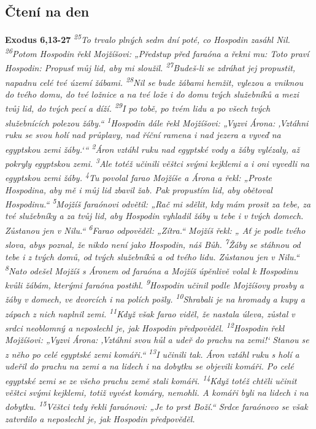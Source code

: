 \documentclass[11pt]{article}
\begin{document}
\subsection*{Čtení na den}
\textbf{Exodus 6,13-27}
\newline
\textit{ 
\textsuperscript{25}To trvalo plných sedm dní poté, co Hospodin zasáhl Nil.
\textsuperscript{26}Potom Hospodin řekl Mojžíšovi: „Předstup před faraóna a řekni mu: Toto praví Hospodin: Propusť můj lid, aby mi sloužil.
\textsuperscript{27}Budeš-li se zdráhat jej propustit, napadnu celé tvé území žábami.
\textsuperscript{28}Nil se bude žábami hemžit, vylezou a vniknou do tvého domu, do tvé ložnice a na tvé lože i do domu tvých služebníků a mezi tvůj lid, do tvých pecí a díží.
\textsuperscript{29}I po tobě, po tvém lidu a po všech tvých služebnících polezou žáby.“
\textsuperscript{1}Hospodin dále řekl Mojžíšovi: „Vyzvi Árona: ‚Vztáhni ruku se svou holí nad průplavy, nad říční ramena i nad jezera a vyveď na egyptskou zemi žáby.‘“
\textsuperscript{2}Áron vztáhl ruku nad egyptské vody a žáby vylézaly, až pokryly egyptskou zemi.
\textsuperscript{3}Ale totéž učinili věštci svými kejklemi a i oni vyvedli na egyptskou zemi žáby.
\textsuperscript{4}Tu povolal farao Mojžíše a Árona a řekl: „Proste Hospodina, aby mě i můj lid zbavil žab. Pak propustím lid, aby obětoval Hospodinu.“
\textsuperscript{5}Mojžíš faraónovi odvětil: „Rač mi sdělit, kdy mám prosit za tebe, za tvé služebníky a za tvůj lid, aby Hospodin vyhladil žáby u tebe i v tvých domech. Zůstanou jen v Nilu.“
\textsuperscript{6}Farao odpověděl: „Zítra.“ Mojžíš řekl: „ Ať je podle tvého slova, abys poznal, že nikdo není jako Hospodin, náš Bůh.
\textsuperscript{7}Žáby se stáhnou od tebe i z tvých domů, od tvých služebníků a od tvého lidu. Zůstanou jen v Nilu.“
\textsuperscript{8}Nato odešel Mojžíš s Áronem od faraóna a Mojžíš úpěnlivě volal k Hospodinu kvůli žábám, kterými faraóna postihl.
\textsuperscript{9}Hospodin učinil podle Mojžíšovy prosby a žáby v domech, ve dvorcích i na polích pošly.
\textsuperscript{10}Shrabali je na hromady a kupy a zápach z nich naplnil zemi.
\textsuperscript{11}Když však farao viděl, že nastala úleva, zůstal v srdci neoblomný a neposlechl je, jak Hospodin předpověděl.
\textsuperscript{12}Hospodin řekl Mojžíšovi: „Vyzvi Árona: ‚Vztáhni svou hůl a udeř do prachu na zemi!‘ Stanou se z něho po celé egyptské zemi komáři.“
\textsuperscript{13}I učinili tak. Áron vztáhl ruku s holí a udeřil do prachu na zemi a na lidech i na dobytku se objevili komáři. Po celé egyptské zemi se ze všeho prachu země stali komáři.
\textsuperscript{14}Když totéž chtěli učinit věštci svými kejklemi, totiž vyvést komáry, nemohli. A komáři byli na lidech i na dobytku.
\textsuperscript{15}Věštci tedy řekli faraónovi: „Je to prst Boží.“ Srdce faraónovo se však zatvrdilo a neposlechl je, jak Hospodin předpověděl.
}
\end{document}
